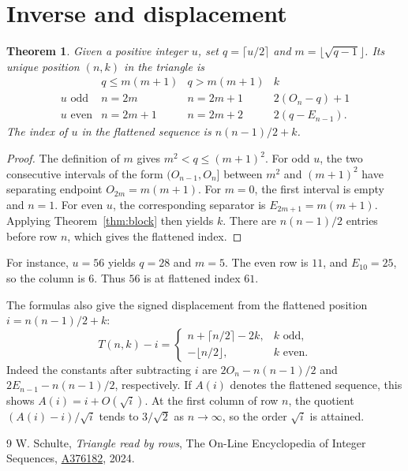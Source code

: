 \documentclass[11pt]{article}
\newtheorem{theorem}{Theorem}
\begin{document}
\section{Inverse and displacement}

\begin{theorem}
Given a positive integer \(u\), set \(q=\lceil u/2\rceil\) and \(m=\lfloor\sqrt{q-1}\rfloor\). Its unique position \((n,k)\) in the triangle is
\[
\begin{array}{c|cc|c}
 & q\le m(m+1) & q>m(m+1) & k\\ \hline
u\text{ odd} & n=2m   & n=2m+1 & 2(O_n-q)+1\\
u\text{ even}& n=2m+1 & n=2m+2 & 2(q-E_{n-1}).
\end{array}
\]
The index of \(u\) in the flattened sequence is \(n(n-1)/2+k\).
\end{theorem}

\begin{proof}
The definition of \(m\) gives \(m^2<q\le(m+1)^2\). For odd \(u\), the two consecutive intervals of the form \((O_{n-1},O_n]\) between \(m^2\) and \((m+1)^2\) have separating endpoint \(O_{2m}=m(m+1)\). For \(m=0\), the first interval is empty and \(n=1\). For even \(u\), the corresponding separator is \(E_{2m+1}=m(m+1)\). Applying Theorem~\ref{thm:block} then yields \(k\). There are \(n(n-1)/2\) entries before row \(n\), which gives the flattened index.
\end{proof}

For instance, \(u=56\) yields \(q=28\) and \(m=5\). The even row is \(11\), and \(E_{10}=25\), so the column is \(6\). Thus \(56\) is at flattened index \(61\).

The formulas also give the signed displacement from the flattened position \(i=n(n-1)/2+k\):
\[
 T(n,k)-i=
 \begin{cases}
 n+\lceil n/2\rceil-2k, & k\text{ odd},\\
 -\lfloor n/2\rfloor, & k\text{ even}.
 \end{cases}
\]
Indeed the constants after subtracting \(i\) are \(2O_n-n(n-1)/2\) and \(2E_{n-1}-n(n-1)/2\), respectively. If \(A(i)\) denotes the flattened sequence, this shows \(A(i)=i+O(\sqrt i)\). At the first column of row \(n\), the quotient \((A(i)-i)/\sqrt i\) tends to \(3/\sqrt{2}\) as \(n\to\infty\), so the order \(\sqrt i\) is attained.

\begin{thebibliography}{9}
W. Schulte, \emph{Triangle read by rows}, The On-Line Encyclopedia of Integer Sequences,
\href{https://oeis.org/A376182}{A376182}, 2024.
\end{thebibliography}
\end{document}
